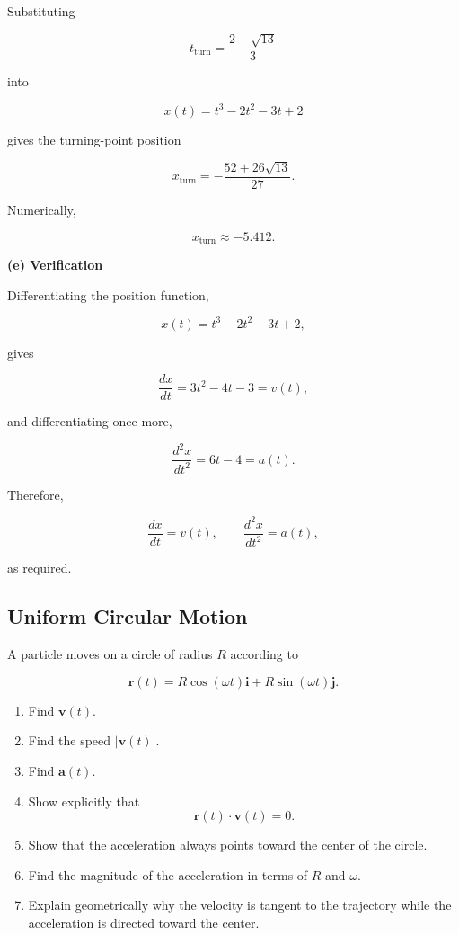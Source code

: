 \documentclass[12pt]{article}
\theoremstyle{remark}
\begin{document}
Substituting

\[
t_{\mathrm{turn}}
=
\frac{2+\sqrt{13}}{3}
\]

into

\[
x(t)=t^3-2t^2-3t+2
\]

gives the turning-point position

\[
\boxed{
x_{\mathrm{turn}}
=
-\frac{52+26\sqrt{13}}{27}.
}
\]

Numerically,

\[
x_{\mathrm{turn}}\approx -5.412.
\]

\textbf{(e) Verification}

Differentiating the position function,

\[
x(t)=t^3-2t^2-3t+2,
\]

gives

\[
\frac{dx}{dt}
=
3t^2-4t-3
=
v(t),
\]

and differentiating once more,

\[
\frac{d^2x}{dt^2}
=
6t-4
=
a(t).
\]

Therefore,

\[
\boxed{
\frac{dx}{dt}=v(t),
\qquad
\frac{d^2x}{dt^2}=a(t),
}
\]

as required.


\subsection{Uniform Circular Motion}

A particle moves on a circle of radius \(R\) according to

\[
\mathbf{r}(t)
=
R\cos(\omega t)\mathbf{i}
+
R\sin(\omega t)\mathbf{j}.
\]

\begin{enumerate}
    \item Find \(\mathbf{v}(t)\).
    \item Find the speed \( |\mathbf{v}(t)|\).
    \item Find \(\mathbf{a}(t)\).
    \item Show explicitly that
    \[
    \mathbf{r}(t)\cdot\mathbf{v}(t)=0.
    \]
    \item Show that the acceleration always points toward the center of the circle.
    \item Find the magnitude of the acceleration in terms of \(R\) and \(\omega\).
    \item Explain geometrically why the velocity is tangent to the trajectory while the acceleration is directed toward the center.
\end{enumerate}
\end{document}
